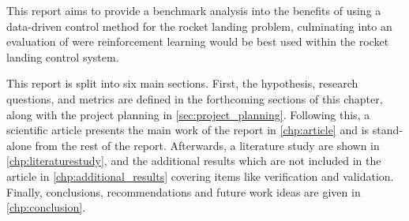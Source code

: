 This report aims to provide a benchmark analysis into the benefits of using a data-driven control method for the rocket landing problem, culminating into an evaluation of were reinforcement learning would be best used within the rocket landing control system.

This report is split into six main sections. First, the hypothesis, research questions, and metrics are defined in the forthcoming sections of this chapter, along with the project planning in \autoref{sec:project_planning}. Following this, a scientific article presents the main work of the report in \autoref{chp:article} and is stand-alone from the rest of the report. Afterwards, a literature study are shown in \autoref{chp:literaturestudy}, and the additional results which are not included in the article in \autoref{chp:additional_results} covering items like verification and validation. Finally, conclusions, recommendations and future work ideas are given in \autoref{chp:conclusion}.
